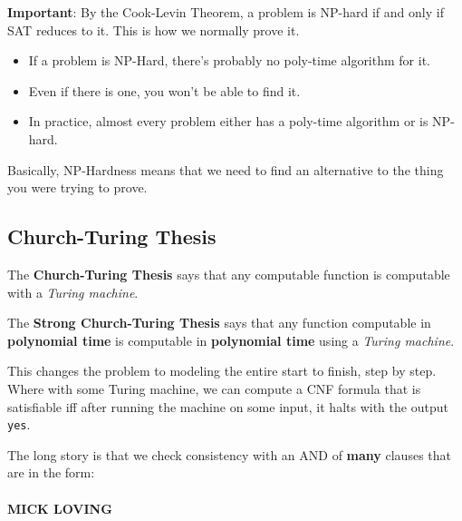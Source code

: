 \documentclass[11pt,fleqn,a4paper,titlepage,dvipsnames,cmyk]{scrartcl}
\begin{document}
\textbf{Important}: By the Cook-Levin Theorem, a problem is NP-hard if and
only if SAT reduces to it. This is how we normally prove it.

\begin{itemize}
    \item If a problem is NP-Hard, there's probably no poly-time algorithm
        for it.
    \item Even if there is one, you won't be able to find it.
    \item In practice, almost every problem either has a poly-time
        algorithm or is NP-hard.
\end{itemize}

Basically, NP-Hardness means that we need to find an alternative to the
thing you were trying to prove.

\subsection{Church-Turing Thesis}%
\label{sub:Church-Turing Thesis}
The \textbf{Church-Turing Thesis} says that any computable function is
computable with a \textit{Turing machine}.

The \textbf{Strong Church-Turing Thesis} says that any function computable
in \textbf{polynomial time} is computable in \textbf{polynomial time}
using a \textit{Turing machine}.

This changes the problem to modeling the entire start to finish, step by
step. Where with some Turing machine, we can compute a CNF formula that is
satisfiable iff after running the machine on some input, it halts with the
output \texttt{yes}.

The long story is that we check consistency with an AND of \textbf{many}
clauses that are in the form:
\begin{align*}
    [P_{i,t} = 1 \wedge S_{3,r=1} \wedge C_{i,T} = 0 \Rightarrow C_{i,r+1} = 1]
\end{align*}

\newpage
\fontsize{64}{10}\selectfont
{\color{red}\textbf{MICK LOVING}}
\end{document}
